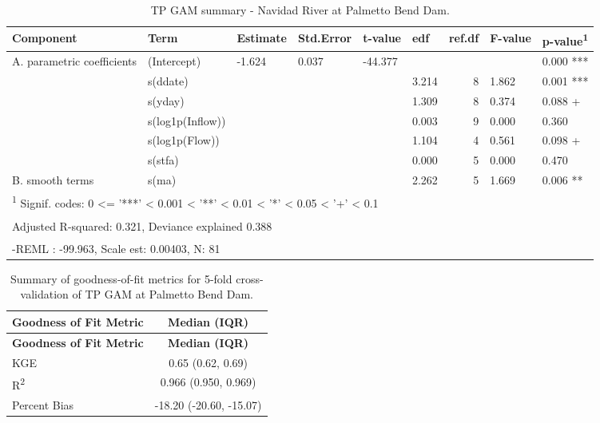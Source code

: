 \documentclass[
]{article}
\newenvironment{widestuff}{\begin{table}[h]\begin{adjustwidth}{-4.5cm}{-4.5cm}\centering}{\end{adjustwidth}\end{table}}
\begin{document}
\begin{widestuff}

\caption{TP GAM summary - Navidad River at Palmetto Bend Dam.}
\centering
\begin{tabular}[t]{llllllrll}
\toprule
Component & Term & Estimate & Std.Error & t-value & edf & ref.df & F-value & p-value\textsuperscript{1}\\
\midrule
A. parametric coefficients & (Intercept) & -1.624 & 0.037 & -44.377 &  &  &  & 0.000 ***\\
\cmidrule{1-9}
 & s(ddate) &  &  &  & 3.214 & 8 & 1.862 & 0.001 ***\\

 & s(yday) &  &  &  & 1.309 & 8 & 0.374 & 0.088 +\\

 & s(log1p(Inflow)) &  &  &  & 0.003 & 9 & 0.000 & 0.360\\

 & s(log1p(Flow)) &  &  &  & 1.104 & 4 & 0.561 & 0.098 +\\

 & s(stfa) &  &  &  & 0.000 & 5 & 0.000 & 0.470\\

\multirow[t]{-6}{*}{\raggedright\arraybackslash B. smooth terms} & s(ma) &  &  &  & 2.262 & 5 & 1.669 & 0.006 **\\
\bottomrule
\multicolumn{9}{l}{\textsuperscript{1} Signif. codes: 0 <= '***' < 0.001 < '**' < 0.01 < '*' < 0.05 < '+' < 0.1}\\
\multicolumn{9}{l}{\textsuperscript{} Adjusted R-squared: 0.321, Deviance explained 0.388}\\
\multicolumn{9}{l}{\textsuperscript{} -REML : -99.963, Scale est: 0.00403, N: 81}\\
\end{tabular}
\end{widestuff}

\hypertarget{tbl-TPPalmettoBend-CV}{}
\begin{longtable}[]{@{}lc@{}}
\caption{\label{tbl-TPPalmettoBend-CV}Summary of goodness-of-fit metrics
for 5-fold cross-validation of TP GAM at Palmetto Bend
Dam.}\tabularnewline
\toprule()
\textbf{Goodness of Fit Metric} & \textbf{Median (IQR)} \\
\midrule()
\endfirsthead
\toprule()
\textbf{Goodness of Fit Metric} & \textbf{Median (IQR)} \\
\midrule()
\endhead
KGE & 0.65 (0.62, 0.69) \\
R\textsuperscript{2} & 0.966 (0.950, 0.969) \\
Percent Bias & -18.20 (-20.60, -15.07) \\
\bottomrule()
\end{longtable}
\end{document}
